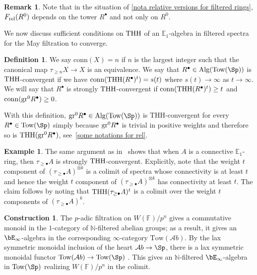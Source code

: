 \documentclass[english,10pt]{amsart}
\newcommand{\rel}{\textup{rel}}
\newcommand{\field}{\mathbb{F}}
\theoremstyle{definition}
\newtheorem{defi}{Definition}[section]
\newtheorem{cons}{Construction}[section]
\newtheorem{exam}{Example}[section]
\newtheorem{rema}{Remark}[section]
\numberwithin{equation}{section}
\DeclareMathOperator{\thh}{\ensuremath{\textup{THH}}}
\newcommand{\THH}{\thh}
\newcommand{\Tow}{\mathrm{Tow}}
\newcommand{\Alg}{\mathrm{Alg}}
\newcommand{\N}{\mathbb{N}}
\newcommand{\wtw}{\tau_{\geq \bullet}}
\newcommand{\grzero}{\textup{gr}^0}
\begin{document}
\begin{rema}
Note that in the situation of \autoref{nota relative versions for filtered rings}, $F_{\rel}(R^0)$ depends on the tower $R^\bullet$ and not only on $R^0$.
\end{rema}

We now discuss sufficient conditions on $\thh$ of an $\mathbb{E}_1$-algebra in filtered spectra for the May filtration to converge. 
\begin{defi}\label{def:connectivit-assumption}
We say $\mathrm{conn}(X)=n$ if $n$ is the largest integer such that the canonical map $\tau_{\ge n}X\to X$ is an equivalence. We say that $R^{\bullet}\in \Alg(\Tow(\Sp))$ is $\thh$-convergent if we have $\mathrm{conn}(\thh(R^{\bullet})^t)=s(t)$ where $s(t)\to \infty$ as $t\to \infty$. We will say that $R^{\bullet}$ is strongly  $\thh$-convergent if  $\mathrm{conn}(\thh(R^{\bullet})^t)\geq t$ and $\mathrm{conn}(\grzero R^\bullet)\geq 0$. 

\end{defi}

With this definition, $\grzero R^\bullet\in \mathrm{Alg}(\Tow(\Sp))$ is THH-convergent for every $R^\bullet \in \Tow(\Sp)$ simply because $\grzero R^\bullet$ is trivial in positive  weights and therefore so is $\THH(\grzero R^\bullet)$, see~\autoref{some notations for rel}. 

\begin{exam}\label{ex-thh-convergent}
The same argument as in~\cite[Lemma~3.4.7]{AKS18} shows that when $A$ is a connective $\mathbb{E}_1$-ring, then $\tau_{\ge \bullet}A$ is strongly $\thh$-convergent.   Explicitly, note that the weight $t$ component of $(\wtw A)^{\otimes k}$ is a colimit of spectra whose connectivity is at least $t$ \cite[Notation 3.1.2]{lurie2015rotation} and hence the weight $t$ component of $(\wtw A)^{\otimes k}$ has connectivity at least $t$. The claim follows by noting that $\thh(\wtw A)^{t}$ is a colimit over the weight $t$ components of $(\wtw A)^k$.

\end{exam}

\begin{cons}\label{example-p-adic-filtration}
The $p$-adic filtration on $W(\field)/p^n$ gives a commutative monoid in the $1$-category of $\N$-filtered abelian groups; as a result, it gives an $\bE_\infty$-algebra in the corresponding $\infty$-category $\Tow(\mathcal{A}b)$. By the lax symmetric monoidal inclusion of the heart $\mathcal{A}b \to \Sp$, there is a lax symmetric monoidal functor $\Tow(\mathcal{A}b) \to \Tow(\Sp)$  \cite[Corollary 3.7]{nikolaus2016stablemultyoneda}. This gives an $\N$-filtered $\bE_\infty$-algebra in $\Tow(\Sp)$ realizing $W(\field)/p^n$ in the colimit.
\end{cons}
\end{document}
